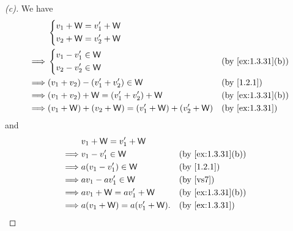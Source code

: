 \begin{proof}[(c)]
  We have
  \begin{align*}
             & \begin{dcases}
      v_1 + \W = v_1' + \W \\
      v_2 + \W = v_2' + \W
    \end{dcases}                                                              \\
    \implies & \begin{dcases}
      v_1 - v_1' \in \W \\
      v_2 - v_2' \in \W
    \end{dcases}                         &  & \text{(by \cref{ex:1.3.31}(b))} \\
    \implies & (v_1 + v_2) - (v_1' + v_2') \in \W                  &  & \text{(by \cref{1.2.1})}        \\
    \implies & (v_1 + v_2) + \W = (v_1' + v_2') + \W               &  & \text{(by \cref{ex:1.3.31}(b))} \\
    \implies & (v_1 + \W) + (v_2 + \W) = (v_1' + \W) + (v_2' + \W) &  & \text{(by \cref{ex:1.3.31})}
  \end{align*}
  and
  \begin{align*}
             & v_1 + \W = v_1' + \W                                             \\
    \implies & v_1 - v_1' \in \W           &  & \text{(by \cref{ex:1.3.31}(b))} \\
    \implies & a(v_1 - v_1') \in \W        &  & \text{(by \cref{1.2.1})}        \\
    \implies & av_1 - av_1' \in \W         &  & \text{(by \ref{vs7})}           \\
    \implies & av_1 + \W = av_1' + \W      &  & \text{(by \cref{ex:1.3.31}(b))} \\
    \implies & a(v_1 + \W) = a(v_1' + \W). &  & \text{(by \cref{ex:1.3.31})}
  \end{align*}
\end{proof}

